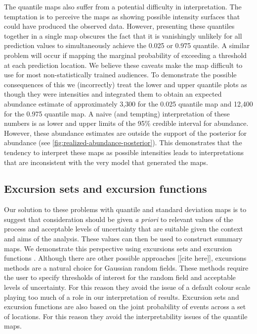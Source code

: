 \documentclass[preprint,12pt]{elsarticle}
\begin{document}
The quantile maps also suffer from a potential difficulty in interpretation. The temptation is to perceive the maps as showing possible intensity surfaces that could have produced the observed data.  However, presenting these quantiles together in a single map obscures the fact that it is vanishingly unlikely for all prediction values to simultaneously achieve the 0.025 or 0.975 quantile.  A similar problem will occur if mapping the marginal probability of exceeding a threshold at each prediction location.  We believe these caveats make the map difficult to use for most non-statistically trained audiences.  To demonstrate the possible consequences of this we (incorrectly) treat the lower and upper quantile plots as though they were intensities and integrated them to obtain an expected abundance estimate of approximately 3,300 for the 0.025 quantile map and 12,400 for the 0.975 quantile map.  A naive (and tempting) interpretation of these numbers is as lower and upper limits of the 95\% credible interval for abundance. However, these abundance estimates are outside the support of the posterior for abundance (see \autoref{fig:realized-abundance-posterior}).  This demonstrates that the tendency to interpret these maps as possible intensities leads to interpretations that are inconsistent with the very model that generated the maps.

\subsection{Excursion sets and excursion functions}

Our solution to these problems with quantile and standard deviation maps is to suggest that consideration should be given \emph{a priori} to relevant values of the process and acceptable levels of uncertainty that are suitable given the context and aims of the analysis.  These values can then be used to construct summary maps.  We demonstrate this perspective using excursions sets and excursion functions \citep{bolin_excursion_2015}.  Although there are other possible approaches [[cite here]], excursions methods are a natural choice for Gaussian random fields.  These methods require the user to specify thresholds of interest for the random field and acceptable levels of uncertainty.  For this reason they avoid the issue of a default colour scale playing too much of a role in our interpretation of results.  Excursion sets and excursion functions are also based on the joint probability of events across a set of locations.  For this reason they avoid the interpretability issues of the quantile maps.
\end{document}
